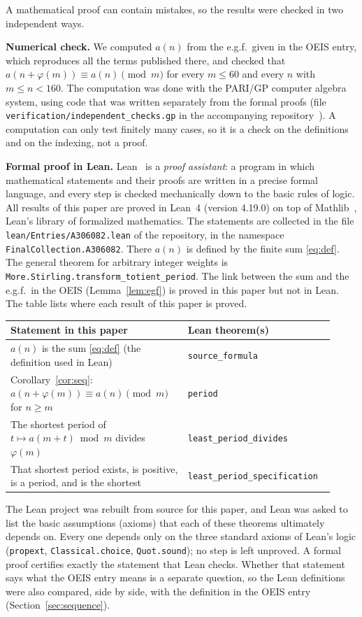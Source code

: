 \documentclass[11pt,a4paper]{article}
\theoremstyle{definition}
\theoremstyle{remark}
\newcommand{\para}[1]{\par\medskip\noindent\textbf{#1}\enspace}
\begin{document}
A mathematical proof can contain mistakes, so the results were checked in two independent ways.

\para{Numerical check.}
We computed $a(n)$ from the e.g.f.\ given in the OEIS entry, which reproduces all the terms published there, and
checked that $a(n+\varphi(m))\equiv a(n)\pmod m$ for every $m\le60$ and every $n$ with $m\le n<160$.
The computation was done with the PARI/GP computer algebra system, using code that was written separately from the
formal proofs (file \texttt{verification/independent\_checks.gp} in the accompanying repository~\cite{repo}).
A computation can only test finitely many cases, so it is a check on the definitions and on the indexing, not a proof.

\para{Formal proof in Lean.}
Lean~\cite{lean} is a \emph{proof assistant}: a program in which mathematical statements and their proofs are written
in a precise formal language, and every step is checked mechanically down to the basic rules of logic. All results of
this paper are proved in Lean~4 (version 4.19.0) on top of Mathlib~\cite{mathlib}, Lean's library of formalized
mathematics. The statements are collected in the file \texttt{lean/Entries/A306082.lean} of the repository,
in the namespace \texttt{FinalCollection.A306082}. There $a(n)$ is defined by the finite sum \eqref{eq:def}. The general theorem for arbitrary integer weights is \texttt{More.Stirling.transform\_totient\_period}. The link between the sum and the e.g.f.\ in the OEIS (Lemma~\ref{lem:egf}) is proved in this paper but not in Lean.
The table lists where each result of this paper is proved.
\begin{center}\small\renewcommand{\arraystretch}{1.25}
\begin{tabular}{>{\raggedright\arraybackslash}p{0.52\linewidth}>{\raggedright\arraybackslash}p{0.4\linewidth}}
\toprule
Statement in this paper & Lean theorem(s)\\
\midrule
$a(n)$ is the sum \eqref{eq:def} (the definition used in Lean) & \texttt{source\_\allowbreak{}formula} \\
Corollary~\ref{cor:seq}: $a(n+\varphi(m))\equiv a(n)\pmod m$ for $n\ge m$ & \texttt{period} \\
The shortest period of $t\mapsto a(m+t)\bmod m$ divides $\varphi(m)$ & \texttt{least\_\allowbreak{}period\_\allowbreak{}divides} \\
That shortest period exists, is positive, is a period, and is the shortest & \texttt{least\_\allowbreak{}period\_\allowbreak{}specification} \\
\bottomrule
\end{tabular}
\end{center}
The Lean project was rebuilt from source for this paper, and Lean was asked to list the basic assumptions (axioms)
that each of these theorems ultimately depends on. Every one depends only on the three standard axioms of Lean's logic
(\texttt{propext}, \texttt{Classical.choice}, \texttt{Quot.sound}); no step is left unproved. A formal proof certifies
exactly the statement that Lean checks. Whether that statement says what the OEIS entry means is a separate question,
so the Lean definitions were also compared, side by side, with the definition in the OEIS entry
(Section~\ref{sec:sequence}).
\end{document}
